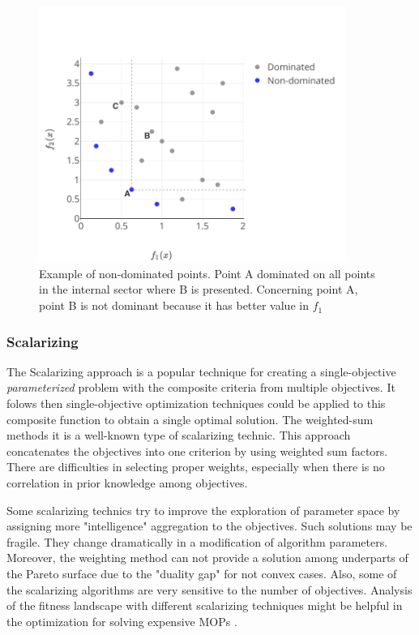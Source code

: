                 \begin{figure}
                    \centering 
                    \includegraphics[width=10cm]{content/images/ndom}
                    \caption[Non-dominated points]{Example of non-dominated points. Point A dominated on all points in the internal sector where B is presented. Concerning point A, point B is not dominant because it has better value in $f_1$} 
                    \label{fig:dominated} 
                \end{figure}
        
            \subsubsection{Scalarizing}
                The Scalarizing approach is a popular technique for creating a single-objective \textit{parameterized} problem with the composite criteria from multiple objectives. It folows then single-objective optimization techniques could be applied to this composite function to obtain a single optimal solution. The weighted-sum methods it is a well-known type of scalarizing technic. This approach concatenates the objectives into one criterion by using weighted sum factors. There are difficulties in selecting proper weights, especially when there is no correlation in prior knowledge among objectives.  

                Some scalarizing technics try to improve the exploration of parameter space by assigning more "intelligence" aggregation to the objectives. Such solutions may be fragile. They change dramatically in a modification of algorithm parameters. Moreover, the weighting method can not provide a solution among underparts of the Pareto surface due to the "duality gap" for not convex cases. Also, some of the scalarizing algorithms are very sensitive to the number of objectives. Analysis of the fitness landscape with different scalarizing techniques might be helpful in the optimization for solving expensive MOPs \cite{ChughScal2019}.

